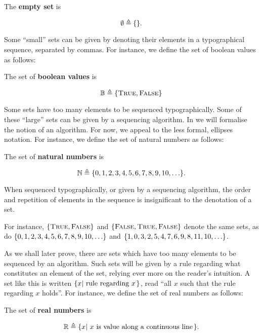 \begin{definition} The \textbf{empty set} is

$$\emptyset\triangleq\mathopen{}\left\{{}\right\}\mathclose{}.$$

\end{definition}

Some ``small'' sets can be given by denoting their elements in a typographical
sequence, separated by commas. For instance, we define the set of boolean
values as follows:

\begin{definition} The set of \textbf{boolean values} is

$$\mathbb{B}\triangleq\mathopen{}\left\{{\text{\textsc{True}},\text{\textsc{False}}}\right\}\mathclose{}$$

\end{definition}

Some sets have too many elements to be sequenced typographically. Some of these
``large'' sets can be given by a sequencing algorithm. In
 we will formalise the notion of an
algorithm. For now, we appeal to the less formal, ellipses notation. For
instance, we define the set of natural numbers as follows:

\begin{definition} The set of \textbf{natural numbers} is

$$\mathbb{N} \triangleq \mathopen{}\left\{{0,1,2,3,4,5,6,7,8,9,10,\ldots}\right\}\mathclose{}.$$

\end{definition}

\begin{remark} When sequenced typographically, or given by a sequencing
algorithm, the order and repetition of elements in the sequence is
insignificant to the denotation of a set. \end{remark}

For instance, $\mathopen{}\left\{{\text{\textsc{True}},\text{\textsc{False}}}\right\}\mathclose{}$ and $\mathopen{}\left\{{\text{\textsc{False}}, \text{\textsc{True}}, \text{\textsc{False}}}\right\}\mathclose{}$
denote the same sets, as do $\mathopen{}\left\{{0,1,2,3,4,5,6,7,8,9,10,\ldots}\right\}\mathclose{}$ and
$\mathopen{}\left\{{1,0,3,2,5,4,7,6,9,8,11,10,\ldots}\right\}\mathclose{}$.

As we shall later prove, there are sets which have too many elements to be
sequenced by an algorithm.  Such sets will be given by a rule regarding what
constitutes an element of the set, relying ever more on the reader's intuition.
A set like this is written $\mathopen{}\left\{{x\mathopen{}\left|\ {\text{rule regarding $x$}}\right.\mathclose{}}\right\}\mathclose{}$, read ``all
$x$ such that the rule regarding $x$ holds''. For instance, we define the set
of real numbers as follows:

\begin{definition} The set of \textbf{real numbers} is

$$\mathbb{R}\triangleq\mathopen{}\left\{{x\mathopen{}\left|\ {\text{$x$ is value along a continuous
line}}\right.\mathclose{}}\right\}\mathclose{}.$$

\end{definition}

